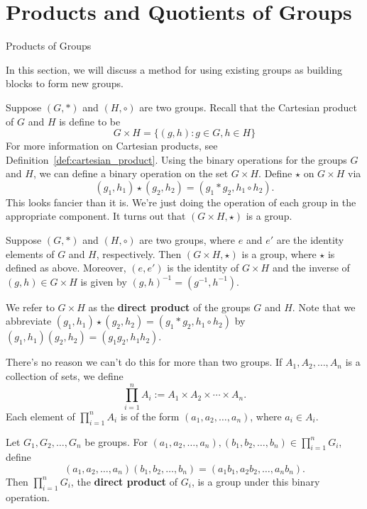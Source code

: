 \chapter{Products and Quotients of Groups}
\label{chapter:products_quotients}
\thispagestyle{empty}

\begin{section}{Products of Groups}

In this section, we will discuss a method for using existing groups as building blocks to form new groups.

Suppose \((G,*)\) and \((H,\circ)\) are two groups.  Recall that the Cartesian product of \(G\) and \(H\) is define to be
\[
G\times H=\{(g,h):g\in G,h\in H\}
\]
For more information on Cartesian products, see Definition~\ref{def:cartesian_product}.  Using the binary operations for the groups \(G\) and \(H\), we can define a binary operation on the set \(G\times H\).  Define \(\star\) on \(G\times H\) via
\[
(g_1,h_1)\star(g_2,h_2)=(g_1*g_2,h_1\circ h_2).
\]
This looks fancier than it is.  We're just doing the operation of each group in the appropriate component.  It turns out that \((G\times H,\star)\) is a group.

\begin{theorem}
Suppose \((G,*)\) and \((H,\circ)\) are two groups, where \(e\) and \(e'\) are the identity elements of \(G\) and \(H\), respectively.   Then \((G\times H,\star)\) is a group, where \(\star\) is defined as above.  Moreover, \((e,e')\) is the identity of \(G\times H\) and the inverse of \((g,h)\in G\times H\) is given by \((g,h)^{-1}=(g^{-1},h^{-1})\).
\end{theorem}

We refer to \(G\times H\) as the \textbf{direct product} of the groups \(G\) and \(H\).  Note that we abbreviate \((g_1,h_1)\star(g_2,h_2)=(g_1*g_2,h_1\circ h_2)\) by \((g_1,h_1)(g_2,h_2)=(g_1 g_2,h_1 h_2)\).

There's no reason we can't do this for more than two groups.  If \(A_1, A_2, \ldots, A_n\) is a collection of sets, we define
\[
\prod_{i=1}^nA_i:=A_1\times A_2\times \cdots \times A_n.
\]
Each element of \(\prod_{i=1}^nA_i\) is of the form \((a_1,a_2,\ldots, a_n)\), where \(a_i\in A_i\).

\begin{theorem}
Let \(G_1, G_2,\ldots, G_n\) be groups.  For \((a_1,a_2, \ldots, a_n), (b_1,b_2,\ldots, b_n)\in \prod_{i=1}^nG_i\), define
\[
(a_1,a_2, \ldots, a_n)(b_1,b_2,\ldots, b_n)=(a_1b_1,a_2b_2,\ldots, a_nb_n).
\]
Then \(\prod_{i=1}^nG_i\), the \textbf{direct product} of \(G_i\), is a group under this binary operation.
\end{theorem}


\end{section}
